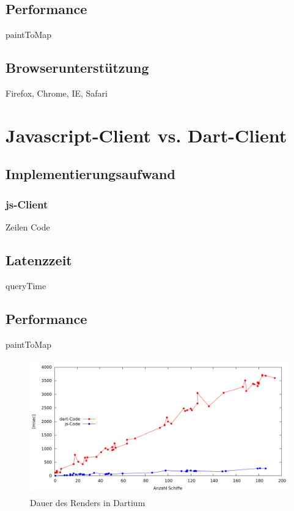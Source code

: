 \subsection{Performance}
paintToMap

\subsection{Browserunterstützung}
Firefox, Chrome, IE, Safari


\section{Javascript-Client vs. Dart-Client} 
\subsection{Implementierungsaufwand}

\subsubsection{js-Client}
Zeilen Code



\subsection{Latenzzeit}
queryTime

\subsection{Performance}
paintToMap
\newpage

\begin {figure}[H]
\begin{center}
  \includegraphics[height=2.3in]{images/Dartium.png}
\end{center}
 \caption{Dauer des Renders in Dartium}
\end {figure}


